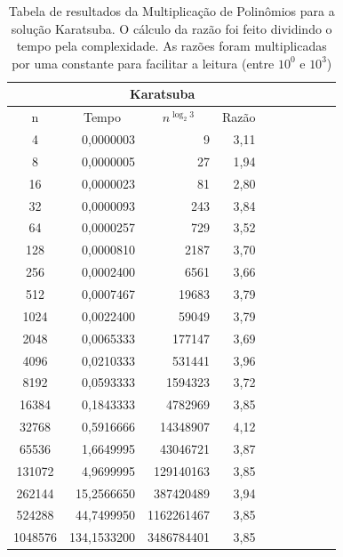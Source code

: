 \documentclass[
	12pt,				%
	oneside,			%
	a4paper,			%
	english,			%
	french,				%
	spanish,			%
	brazil,				%
	]{abntex2}
\begin{document}
\begin{table}[H]
  \centering    
  \begin{tabular}{|c|r|r|r|r|r|r|r|r|r|}
    \toprule
    \multicolumn{1}{|c|}{\cellcolor{gray!25}\textbf{}} &
    \multicolumn{3}{|c|}{\cellcolor{gray!25}\textbf{Karatsuba}} \\
    \midrule
    \multicolumn{1}{|c|}{\cellcolor{gray!10}n} &
    \multicolumn{1}{|c|}{\cellcolor{gray!10}Tempo} &
    \multicolumn{1}{|c|}{\cellcolor{gray!10}$n^{\log_{2}{3}}$} &
    \multicolumn{1}{|c|}{\cellcolor{gray!10}Razão} \\
    4	&	0,0000003	&	9	&	3,11	 \\ \hline
    8	&	0,0000005	&	27	&	1,94	 \\ \hline
    16	&	0,0000023	&	81	&	2,80	 \\ \hline
    32	&	0,0000093	&	243	&	3,84	 \\ \hline
    64	&	0,0000257	&	729	&	3,52	 \\ \hline
    128	&	0,0000810	&	2187	&	3,70	 \\ \hline
    256	&	0,0002400	&	6561	&	3,66	 \\ \hline
    512	&	0,0007467	&	19683	&	3,79	 \\ \hline
    1024	&	0,0022400	&	59049	&	3,79	 \\ \hline
    2048	&	0,0065333	&	177147	&	3,69	 \\ \hline
    4096	&	0,0210333	&	531441	&	3,96	 \\ \hline
    8192	&	0,0593333	&	1594323	&	3,72	 \\ \hline
    16384	&	0,1843333	&	4782969	&	3,85	 \\ \hline
    32768	&	0,5916666	&	14348907	&	4,12	 \\ \hline
    65536	&	1,6649995	&	43046721	&	3,87	 \\ \hline
    131072	&	4,9699995	&	129140163	&	3,85	 \\ \hline
    262144	&	15,2566650	&	387420489	&	3,94	 \\ \hline
    524288	&	44,7499950	&	1162261467	&	3,85	 \\ \hline
    1048576	&	134,1533200	&	3486784401	&	3,85	 \\ \hline
  \end{tabular}
  \caption{Tabela de resultados da Multiplicação de Polinômios para a solução Karatsuba. O cálculo da razão foi feito dividindo o tempo pela complexidade. As razões foram multiplicadas por uma constante para facilitar a leitura (entre $10^0$ e $10^3$)}  
  \label{tab:polymul}
\end{table}
\end{document}
